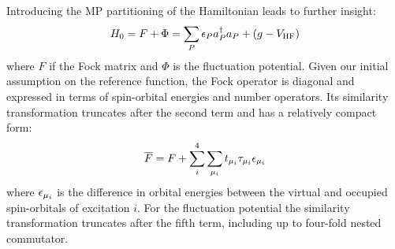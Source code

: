 Introducing the \acl{MP} partitioning of the Hamiltonian leads to
further insight:
\begin{equation}
 H_0 = F + \Phi = \sum_P\epsilon_Pa_{P}^{\dagger}a_{P} + (g- V_\mathrm{HF})
\end{equation}
where $F$ if the Fock matrix and $\Phi$ is the fluctuation potential.
Given our initial assumption on the reference function, the Fock
operator is diagonal and expressed in terms of spin-orbital energies and
number operators.
Its similarity transformation truncates after the second term and has a
relatively compact form:
\begin{equation}
  \overline{F} = F + \sum_{i}^4\sum_{\mu_i}t_{\mu_i}\tau_{\mu_i}\epsilon_{\mu_i}
\end{equation}
where $\epsilon_{\mu_i}$ is the difference in orbital energies between the
virtual and occupied spin-orbitals of excitation $i$.
For the fluctuation potential the similarity transformation truncates
after the fifth term, including up to four-fold nested commutator.

